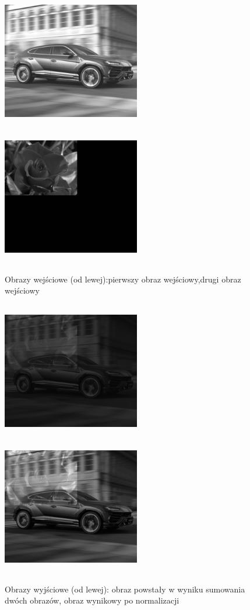 \documentclass[magisterska,openany]{pracadypl}
\begin{document}
\newpage
\begin{figure}[h]
\centering
\includegraphics[width=6cm, height=6cm]{2_2/ResolG3.jpg}
\includegraphics[width=6cm, height=6cm]{2_2/ResolG4.jpg}
\caption{Obrazy wejściowe (od lewej):pierwszy obraz wejściowy,drugi obraz wejściowy}
\end{figure}
\begin{figure}[h]
\centering
\includegraphics[width=6cm, height=6cm]{3_2/add_twoG2.jpg}
\includegraphics[width=6cm, height=6cm]{3_2/nadd_twoG2.jpg}
\caption{Obrazy wyjściowe (od lewej): obraz powstały w wyniku sumowania dwóch obrazów, obraz wynikowy po normalizacji}
\end{figure}
\end{document}
